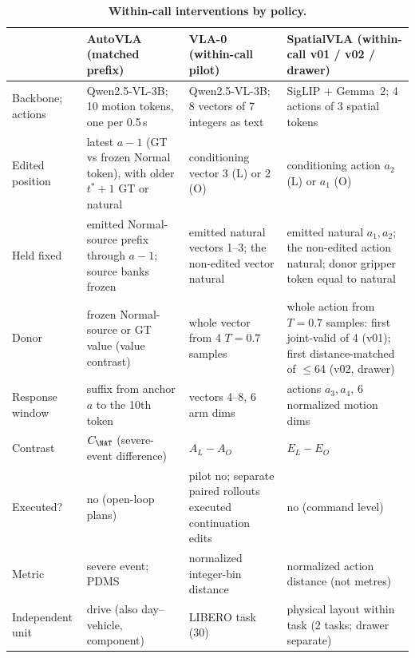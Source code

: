 \begin{table}[h]
\centering\footnotesize
\caption{\textbf{Within-call interventions by policy.}}
\label{tab:crossmodel}
\setlength{\tabcolsep}{3pt}
\begin{tabularx}{\textwidth}{@{}>{\raggedright\arraybackslash}p{2.3cm} >{\raggedright\arraybackslash}X >{\raggedright\arraybackslash}X >{\raggedright\arraybackslash}X@{}}\toprule
 & AutoVLA (matched prefix) & VLA-0 (within-call pilot) & SpatialVLA (within-call v01 / v02 / drawer)\\\midrule
Backbone; actions & Qwen2.5-VL-3B; 10 motion tokens, one per 0.5\,s & Qwen2.5-VL-3B; 8 vectors of 7 integers as text & SigLIP + Gemma~2; 4 actions of 3 spatial tokens\\
Edited position & latest $a{-}1$ (GT vs frozen Normal token), with older $t^*{+}1$ GT or natural & conditioning vector 3 (L) or 2 (O) & conditioning action $a_2$ (L) or $a_1$ (O)\\
Held fixed & emitted Normal-source prefix through $a{-}1$; source banks frozen & emitted natural vectors 1--3; the non-edited vector natural & emitted natural $a_1,a_2$; the non-edited action natural; donor gripper token equal to natural\\
Donor & frozen Normal-source or GT value (value contrast) & whole vector from 4 $T{=}0.7$ samples & whole action from $T{=}0.7$ samples: first joint-valid of 4 (v01); first distance-matched of $\le$64 (v02, drawer)\\
Response window & suffix from anchor $a$ to the 10th token & vectors 4--8, 6 arm dims & actions $a_3,a_4$, 6 normalized motion dims\\
Contrast & $C_{\NAT}$ (severe-event difference) & $A_L-A_O$ & $E_L-E_O$\\
Executed? & no (open-loop plans) & pilot no; separate paired rollouts executed continuation edits & no (command level)\\
Metric & severe event; PDMS & normalized integer-bin distance & normalized action distance (not metres)\\
Independent unit & drive (also day--vehicle, component) & LIBERO task (30) & physical layout within task (2 tasks; drawer separate)\\\bottomrule
\end{tabularx}
\end{table}
